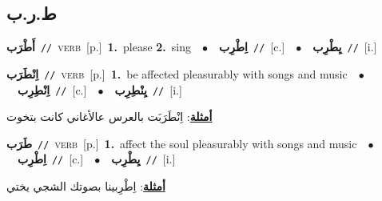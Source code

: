 \documentclass[10pt,a4paper,twoside]{article} %
\begin{document}
\begin{multicols}{2}
\vspace{-3mm}
\subsection*{\color{blue}\foreignlanguage{arabic}{ط.ر.ب}\color{blue}{}} 

{\setlength\topsep{0pt}\textbf{\foreignlanguage{arabic}{أَطْرَب}}\ {\color{gray}\texttt{//}\color{black}}\ \textsc{verb}\ [p.]\ \textbf{1.}~please  \textbf{2.}~sing\ \ $\bullet$\ \ \setlength\topsep{0pt}\textbf{\foreignlanguage{arabic}{اِطْرِب}}\ {\color{gray}\texttt{//}\color{black}}\ [c.]\ \ $\bullet$\ \ \setlength\topsep{0pt}\textbf{\foreignlanguage{arabic}{يِطْرِب}}\ {\color{gray}\texttt{//}\color{black}}\ [i.]\ } \vspace{2mm}

{\setlength\topsep{0pt}\textbf{\foreignlanguage{arabic}{اِنْطَرَب}}\ {\color{gray}\texttt{//}\color{black}}\ \textsc{verb}\ [p.]\ \textbf{1.}~be affected pleasurably with songs and music\ \ $\bullet$\ \ \setlength\topsep{0pt}\textbf{\foreignlanguage{arabic}{اِنْطِرِب}}\ {\color{gray}\texttt{//}\color{black}}\ [c.]\ \ $\bullet$\ \ \setlength\topsep{0pt}\textbf{\foreignlanguage{arabic}{يِنْطِرِب}}\ {\color{gray}\texttt{//}\color{black}}\ [i.]\  \begin{flushright}\color{gray}\foreignlanguage{arabic}{\textbf{\underline{\foreignlanguage{arabic}{أمثلة}}}: اِنْطَرَبَت بالعرس عالأغاني كانت بتخوت}\end{flushright}\color{black}} \vspace{2mm}

{\setlength\topsep{0pt}\textbf{\foreignlanguage{arabic}{طَرَب}}\ {\color{gray}\texttt{//}\color{black}}\ \textsc{verb}\ [p.]\ \textbf{1.}~affect the soul pleasurably with songs and music\ \ $\bullet$\ \ \setlength\topsep{0pt}\textbf{\foreignlanguage{arabic}{اِطْرِب}}\ {\color{gray}\texttt{//}\color{black}}\ [c.]\ \ $\bullet$\ \ \setlength\topsep{0pt}\textbf{\foreignlanguage{arabic}{يِطْرِب}}\ {\color{gray}\texttt{//}\color{black}}\ [i.]\  \begin{flushright}\color{gray}\foreignlanguage{arabic}{\textbf{\underline{\foreignlanguage{arabic}{أمثلة}}}: اِطْرِبينا بصوتك الشجي يختي}\end{flushright}\color{black}} \vspace{2mm}


\end{multicols}
\end{document}
